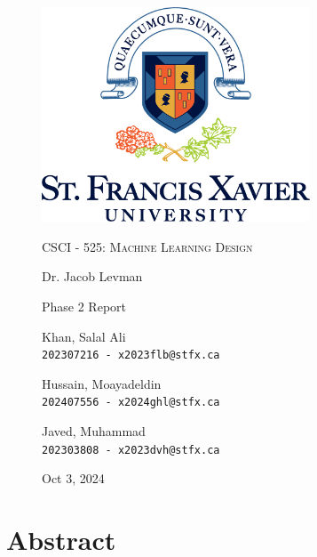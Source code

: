 \documentclass[a4paper,12pt]{article}
\begin{document}
\begin{titlepage}

\begin{figure}[H]
  \centering
  \includegraphics[width=8cm]{../stfx_logo.png}\par
  \vspace{1cm}
  {\scshape\Large CSCI - 525: Machine Learning Design \par}
  \vspace{0.5cm}
  {\large Dr. Jacob Levman \par}
  \vspace{1cm}
  {\Large Phase 2 Report \par}
  \vspace{1cm}
  {\large Khan, Salal Ali\\ \texttt{202307216 - x2023flb@stfx.ca} \par}
  \vspace{0.5cm}
  {\large Hussain, Moayadeldin\\ \texttt{202407556 - x2024ghl@stfx.ca} \par}
  \vspace{0.5cm}
  {\large Javed, Muhammad\\ \texttt{202303808 - x2023dvh@stfx.ca} \par}
  \vfill
  \vspace{0.5cm}
  {\large Oct 3, 2024 \par}
\end{figure}

\end{titlepage}

\section*{Abstract}
\end{document}
